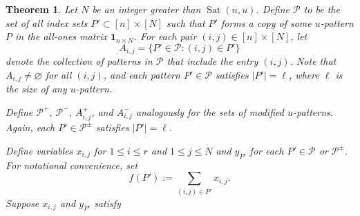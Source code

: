 \documentclass[12pt]{amsart}
\DeclareMathOperator{\Sat}{Sat}
\newtheorem{thm}{Theorem}
\theoremstyle{definition}
\numberwithin{equation}{section}
\numberwithin{table}{thm}
\begin{document}
\begin{thm}\label{thm: linear program}
    Let $N$ be an integer greater than $\Sat(n,   u)$. Define $\mathcal{P}$ to be the set of all index sets $P' \subset [n] \times [N]$ such that $P'$ forms a copy of some $u$-pattern $P$ in the all-ones matrix $\mathbf{1}_{n \times N}$. For each pair $(i, j) \in [n] \times [N]$, let
    \[ A_{i,j} = \{P' \in \mathcal{P} : (i,j) \in P'\} \]
    denote the collection of patterns in $\mathcal{P}$ that include the entry $(i,j)$. Note that $A_{i,j} \neq \varnothing$ for all $(i,j)$, and each pattern $P' \in \mathcal{P}$ satisfies $|P'| = \ell$, where $\ell$ is the size of any $u$-pattern.

    Define $\mathcal{P}^+$, $\mathcal{P}^-$, $A_{i,j}^+$, and $A_{i,j}^-$ analogously for the sets of modified $u$-patterns. Again, each $P' \in \mathcal{P}^\pm$ satisfies $|P'| = \ell$.

     
    Define variables $x_{i,j}$ for $1\le i\le r$ and $1\le j\le N$ and $y_{P'}$ for each $P'\in \mathcal P$ or $\mathcal P^\pm$. For notational convenience, set \[f(P') :=\sum_{(i,j)\in P'}x_{i,j}.\] Suppose $x_{i,j}$ and $y_{P'}$ satisfy


\end{thm}
\end{document}
